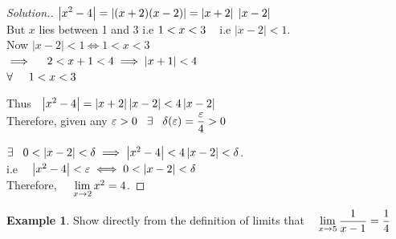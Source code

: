\documentclass[11pt,a4paper]{article}
\theoremstyle{definition}
\newtheorem{exa}[thm]{Example}
\newenvironment{solution}
  {\renewcommand{\qedsymbol}{}\begin{proof}[\textit{Solution}.]}
  {\end{proof}}
\begin{document}
\begin{solution}


$\displaystyle{\left|x^2 - 4\right| = \left|(x+2)(x-2)\right| = \left|x + 2\right|\hspace{0.1cm}\left|x - 2\right|}$\\

But $x$ lies between 1 and 3 i.e $1 < x < 3\hspace{0.3cm}$ i.e $\left|x - 2\right| < 1$.\\

Now $\left|x - 2\right| < 1 \iff 1 < x < 3$\\

$\implies \hspace{0.4cm} 2 < x + 1 < 4 \implies \left|x + 1\right| < 4$\\

$\forall \hspace{0.5cm} 1 < x < 3$


Thus $\hspace{0.2cm} \left|x^2 - 4\right| = \left|x + 2\right|\left|x -2\right| < 4\left|x - 2\right|$\\

Therefore, given any $\varepsilon > 0 \hspace{0.3cm} \exists \hspace{0.3cm} \delta(\varepsilon) = \dfrac{\varepsilon}{4}> 0$


$\exists\hspace{0.3cm} 0 < \left|x - 2\right| < \delta \implies \left|x^2 - 4\right|< 4\left|x - 2\right| < \delta$.\\

i.e $\hspace{0.3cm} \left|x^2 - 4\right| < \varepsilon \iff 0 < \left|x - 2\right| < \delta $\\

Therefore,  $\hspace{0.4cm} \lim\limits_{x \rightarrow 2} x^2 = 4$.
\end{solution}


\begin{exa}


Show directly from the definition of limits that $\hspace{0.3cm} \lim\limits_{x \rightarrow 5} \dfrac{1}{x - 1} = \dfrac{1}{4}$
\end{exa}
\end{document}
